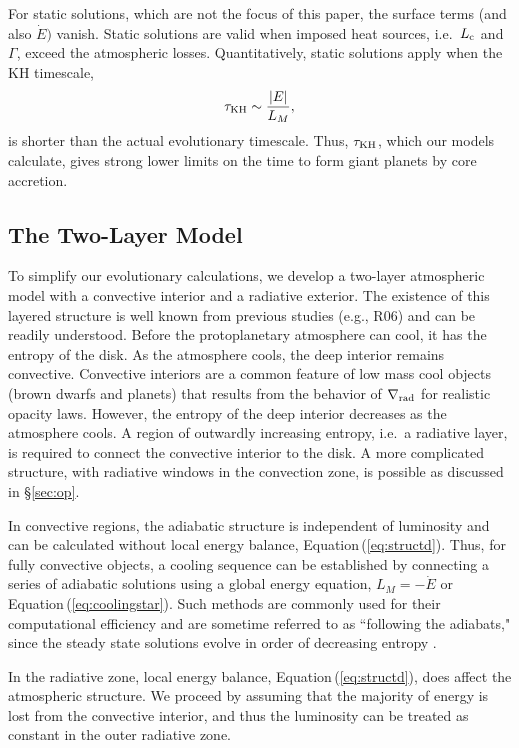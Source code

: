 \documentclass[apj, numberedappendix]{emulateapj}
\newcommand{\Eq}[1]{Equation\,(\ref{#1})}
\newcommand{\delrad}{\nabla_{\rm rad}}
\newcommand{\co}{_{\rm c}}
\begin{document}
For static solutions, which are not the focus of this paper, the surface terms (and also $\dot{E})$ vanish.  Static solutions are valid when imposed heat sources, i.e.\ $L\co$ and $\Gamma$, exceed the atmospheric losses.  Quantitatively, static solutions apply when the KH timescale,
\begin{equation}
\tau_{\rm KH} \sim {|E| \over L_M}, 
\end{equation} 
is shorter than the actual evolutionary timescale.  Thus, $\tau_{\rm KH}$, which our models calculate, gives strong lower limits on the time to form giant planets by core accretion.


\subsection{The Two-Layer Model} \label{sec:twolayer}

To simplify our evolutionary calculations, we develop a two-layer atmospheric model with a convective interior and a radiative exterior.   The existence of this layered structure is well known from previous studies (e.g., R06) and can be readily understood.  Before the protoplanetary atmosphere can cool, it has the entropy of the disk.  As the atmosphere cools, the deep interior remains convective.  Convective interiors are a common feature of low mass cool objects (brown dwarfs and planets) that results from the behavior of $\delrad$ for realistic opacity laws.  However, the entropy of the deep interior decreases as the atmosphere cools.  A region of outwardly increasing entropy, i.e.\ a radiative layer, is required to connect the convective interior to the disk.  A more complicated structure, with radiative windows in the convection zone, is possible as discussed in \S\ref{sec:op}. 

In convective regions, the adiabatic structure is independent of luminosity and can be calculated without local energy balance, \Eq{eq:structd}.  Thus, for fully convective objects, a cooling sequence can be established by connecting a series of adiabatic solutions using a global energy equation, $L_M = -\dot{E}$ or \Eq{eq:coolingstar}.  Such methods are commonly used for their computational efficiency and are sometime referred to as ``following the adiabats," since the steady state solutions evolve in order of decreasing entropy \citep{marleau13}.

In the radiative zone,  local energy balance, \Eq{eq:structd}, does affect the atmospheric structure.  We proceed by assuming that the majority of energy is lost from the convective interior, and thus the luminosity can be treated as constant in the outer radiative zone.
\end{document}
